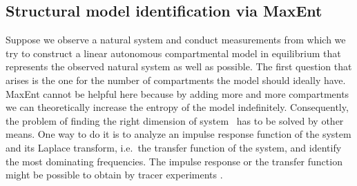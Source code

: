 \documentclass[smallextended]{svjour3}
\makeatletter
\renewcommand*{\eqref}[1]{%
  \hyperref[{#1}]{\textup{\tagform@{\ref*{#1}}}}%
}
\newcommand{\ie}{i.e.}
\makeatother
\begin{document}
\subsection{Structural model identification via MaxEnt}
Suppose we observe a natural system and conduct measurements from which we try to construct a linear autonomous compartmental model in equilibrium that represents the observed natural system as well as possible.
The first question that arises is the one for the number of compartments the model should ideally have.
MaxEnt cannot be helpful here because by adding more and more compartments we can theoretically increase the entropy of the model indefinitely.
Consequently, the problem of finding the right dimension of system~\eqref{eqn:lin_CS_sys} has to be solved by other means.
One way to do it is to analyze an impulse response function of the system and its Laplace transform, \ie\ the transfer function of the system, and identify the most dominating frequencies.
The impulse response or the transfer function might be possible to obtain by tracer experiments \citep{Anderson1983, Walter1986MBS}.
\end{document}
